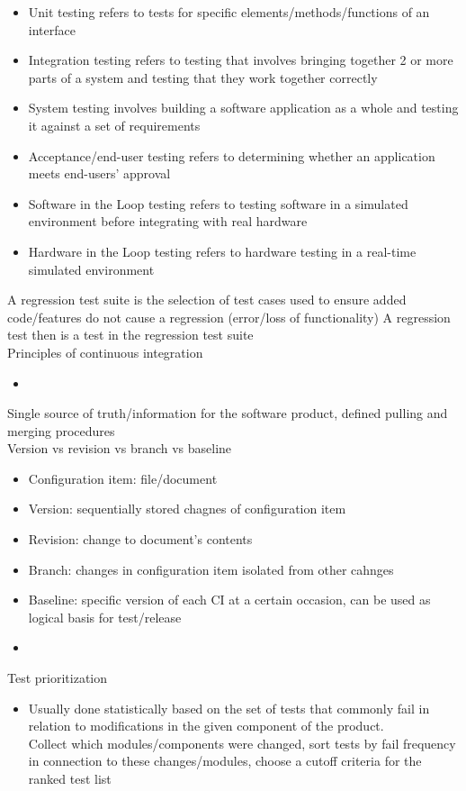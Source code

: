 \documentclass[10pt]{article}
\begin{document}
\begin{itemize}
\item Unit testing refers to tests for specific elements/methods/functions of an interface
\item Integration testing refers to testing that involves bringing together 2 or more parts of a system and testing that they work together correctly
\item System testing involves building a software application as a whole and testing it against a set of requirements
\item Acceptance/end-user testing refers to determining whether an application meets end-users' approval
\item Software in the Loop testing refers to testing software in a simulated environment before integrating with real hardware
\item Hardware in the Loop testing refers to hardware testing in a real-time simulated environment 
\end{itemize}
A regression test suite is the selection of test cases used to ensure added code/features do not cause a regression (error/loss of functionality)
A regression test then is a test in the regression test suite\\
Principles of continuous integration
\begin{itemize}
\item 
\end{itemize}
Single source of truth/information for the software product, defined pulling and merging procedures\\
Version vs revision vs branch vs baseline
\begin{itemize}
\item Configuration item: file/document
\item Version: sequentially stored chagnes of configuration item
\item Revision: change to document's contents
\item Branch: changes in configuration item isolated from other cahnges
\item Baseline: specific version of each CI at a certain occasion, can be used as logical basis for test/release
\end{itemize}
\begin{itemize}
\item 
\end{itemize}
Test prioritization
\begin{itemize}
\item Usually done statistically based on the set of tests that commonly fail in relation to modifications in the given component of the product.\\
Collect which modules/components were changed, sort tests by fail frequency in connection to these changes/modules, choose a cutoff criteria for the ranked test list
\end{itemize}
\end{document}
